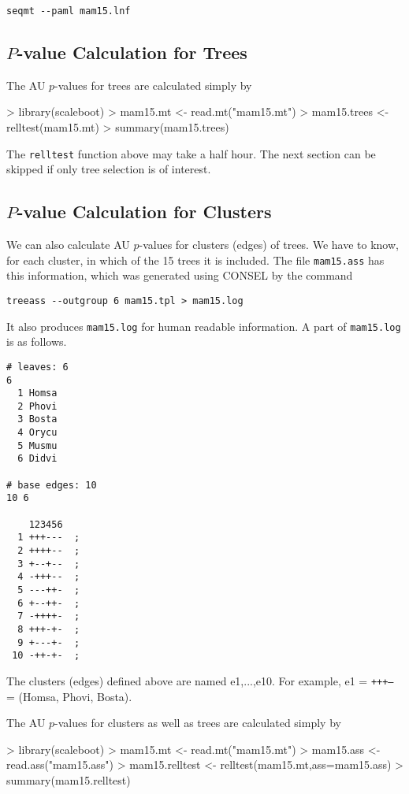 \documentclass[a4paper]{amsart}
\begin{document}
\verb!seqmt --paml mam15.lnf!


\subsection{$P$-value Calculation for Trees}

The AU $p$-values for trees are calculated simply by
\begin{Schunk}
\begin{Sinput}
> library(scaleboot)
> mam15.mt <- read.mt("mam15.mt")
> mam15.trees <- relltest(mam15.mt)
> summary(mam15.trees)
\end{Sinput}
\end{Schunk}
The {\tt relltest} function above may take a half hour. The next
section can be skipped if only tree selection is of interest.

\subsection{$P$-value Calculation for Clusters}

We can also calculate AU $p$-values for clusters (edges) of trees.  We
have to know, for each cluster, in which of the 15 trees it is
included.  The file {\tt mam15.ass} has this information, which was
generated using CONSEL by the command 

\verb!treeass --outgroup 6 mam15.tpl > mam15.log!

It also produces {\tt mam15.log} for human readable information.  A
part of {\tt mam15.log} is as follows.
\begin{verbatim}
# leaves: 6
6
  1 Homsa
  2 Phovi
  3 Bosta
  4 Orycu
  5 Musmu
  6 Didvi

# base edges: 10
10 6
          
    123456
  1 +++---  ;
  2 ++++--  ;
  3 +--+--  ;
  4 -+++--  ;
  5 ---++-  ;
  6 +--++-  ;
  7 -++++-  ;
  8 +++-+-  ;
  9 +---+-  ;
 10 -++-+-  ;
\end{verbatim}
The clusters (edges) defined above are named e1,...,e10. For example,
e1 = {\tt +++---} = (Homsa, Phovi, Bosta).

The AU $p$-values for clusters as well as trees are calculated simply by
\begin{Schunk}
\begin{Sinput}
> library(scaleboot)
> mam15.mt <- read.mt("mam15.mt")
> mam15.ass <- read.ass("mam15.ass")
> mam15.relltest <- relltest(mam15.mt,ass=mam15.ass)
> summary(mam15.relltest)
\end{Sinput}
\end{Schunk}
\end{document}
